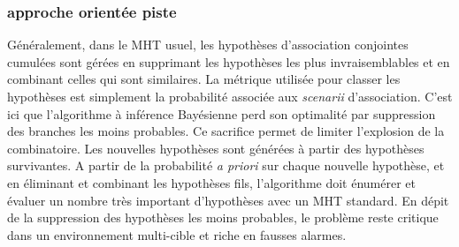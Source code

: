 \documentclass[10pt,french,a4paper]{report}
\begin{document}
\subsubsection{approche orientée piste}
					Généralement, dans le \ac{MHT} usuel, les hypothèses d'association conjointes cumulées sont gérées en supprimant les hypothèses les plus invraisemblables et en combinant celles qui sont similaires. La métrique utilisée pour classer les hypothèses est simplement la probabilité associée aux \textit{scenarii} d'association. C'est ici que l'algorithme à inférence Bayésienne perd son optimalité par suppression des branches les moins probables. Ce sacrifice permet de limiter l'explosion de la combinatoire. Les nouvelles hypothèses sont générées à partir des hypothèses survivantes. A partir de la probabilité \textit{a priori} sur chaque nouvelle hypothèse, et en éliminant et combinant les hypothèses fils, l'algorithme doit énumérer et évaluer un nombre très important d'hypothèses avec un \ac{MHT} standard. En dépit de la suppression des hypothèses les moins probables, le problème reste critique dans un environnement multi-cible et riche en fausses alarmes. 
\end{document}
